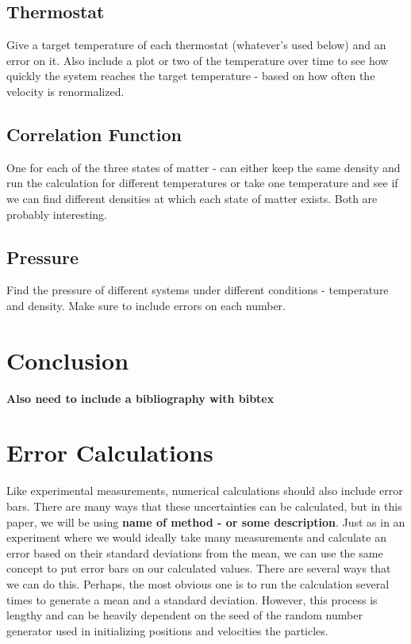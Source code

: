 \documentclass{article}
\begin{document}
\begin{multicols}{2}
\subsection{Thermostat}

Give a target temperature of each thermostat (whatever's used below) and an error on it.  Also include a plot or two of the temperature over time to see how quickly the system reaches the target temperature - based on how often the velocity is renormalized.

\subsection{Correlation Function}

One for each of the three states of matter - can either keep the same density and run the calculation for different temperatures or take one temperature and see if we can find different densities at which each state of matter exists.  Both are probably interesting.

\subsection{Pressure}

Find the pressure of different systems under different conditions - temperature and density.  Make sure to include errors on each number.

\section{Conclusion}
\label{conc}

\textbf{Also need to include a bibliography with bibtex}

\appendix 

\section{Error Calculations}

Like experimental measurements, numerical calculations should also include error bars.  There are many ways that these uncertainties can be calculated, but in this paper, we will be using \textbf{name of method - or some description}.  Just as in an experiment where we would ideally take many measurements and calculate an error based on their standard deviations from the mean, we can use the same concept to put error bars on our calculated values.  There are several ways that we can do this.  Perhaps, the most obvious one is to run the calculation several times to generate a mean and a standard deviation.  However, this process is lengthy and can be heavily dependent on the seed of the random number generator used in initializing positions and velocities the particles.  \\


\end{multicols}
\end{document}
